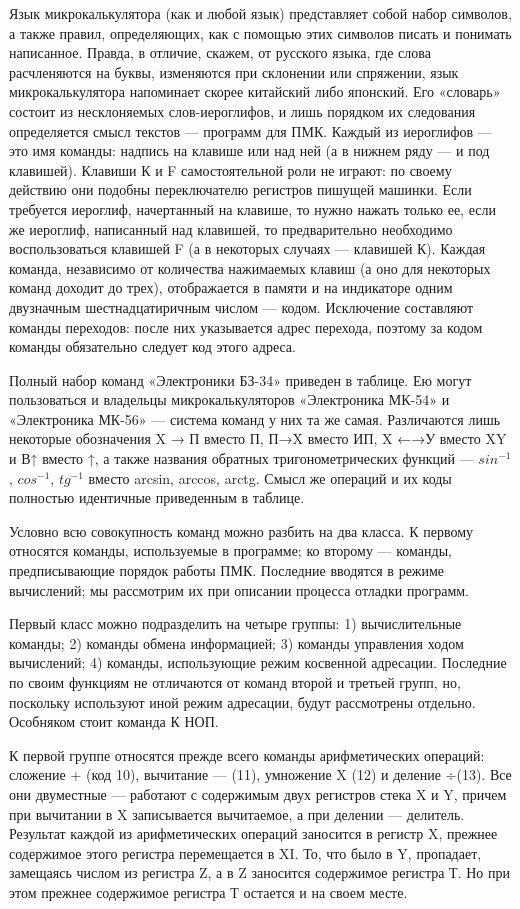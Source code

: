\documentclass[11pt,a4paper,oneside]{article}
\begin{document}
Язык микрокалькулятора (как и любой язык) представляет собой на­бор символов, а также правил, опре­деляющих, как с помощью этих сим­волов писать и понимать написан­ное.
Правда, в отличие, скажем, от рус­ского языка, где слова расчленяются на буквы, изменяются при склоне­нии или спряжении, язык микрокаль­кулятора напоминает скорее китай­ский либо японский. Его «словарь» состоит из несклоняемых слов-иеро­глифов, и лишь порядком их следо­вания определяется смысл текстов — программ для ПМК. Каждый из ие­роглифов — это имя команды: над­пись на клавише или над ней (а в нижнем ряду — и под клавишей). Клавиши К и F самостоятельной ро­ли не играют: по своему действию они подобны переключателю регист­ров пишущей машинки. Если требует­ся иероглиф, начертанный на клави­ше, то нужно нажать только ее, ес­ли же иероглиф, написанный над кла­вишей, то предварительно необходи­мо воспользоваться клавишей F (а в некоторых случаях — клавишей К). Каждая команда, независимо от количества нажимаемых клавиш (а оно для некоторых команд доходит до трех), отображается в памяти и на индикаторе одним двузначным шестнадцатиричным числом — кодом. Исключение составляют команды пе­реходов: после них указывается ад­рес перехода, поэтому за кодом команды обязательно следует код этого адреса.

Полный набор команд «Электрони­ки БЗ-34» приведен в таблице. Ею могут пользоваться и владельцы микрокалькуляторов «Электроника МК-54» и «Электроника МК-56» — система команд у них та же самая. Различаются лишь некоторые обозна­чения X → П вместо П, П→X вместо ИП, X ←→У вместо XY и В↑ вместо ↑, а также названия обратных тригонометрических функ­ций — $sin^{-1}$, $cos^{-1}$, $tg^{-1}$ вместо arcsin, arccos, arctg. Смысл же опе­раций и их коды полностью идентич­ные приведенным в таблице.

Условно всю совокупность команд можно разбить на два класса. К пер­вому относятся команды, используе­мые в программе; ко второму — команды, предписывающие порядок работы ПМК. Последние вводятся в режиме вычислений; мы рассмотрим их при описании процесса отладки программ.

Первый класс можно подразделить на четыре группы: 1) вычислительные команды; 2) команды обмена инфор­мацией; 3) команды управления хо­дом вычислений; 4) команды, исполь­зующие режим косвенной адресации. Последние по своим функциям не от­личаются от команд второй и треть­ей групп, но, поскольку используют иной режим адресации, будут рас­смотрены отдельно. Особняком стоит команда К НОП.

К первой группе относятся преж­де всего команды арифметических операций: сложение + (код 10), вычитание — (11), умножение X (12) и деление ÷(13). Все они дву­местные — работают с содержимым двух регистров стека X и Y, причем при вычитании в X записывается вы­читаемое, а при делении — дели­тель. Результат каждой из арифме­тических операций заносится в ре­гистр X, прежнее содержимое этого регистра перемещается в XI. То, что было в Y, пропадает, замещаясь числом из регистра Z, а в Z зано­сится содержимое регистра Т. Но при этом прежнее содержимое регистра Т остается и на своем месте.
\end{document}

